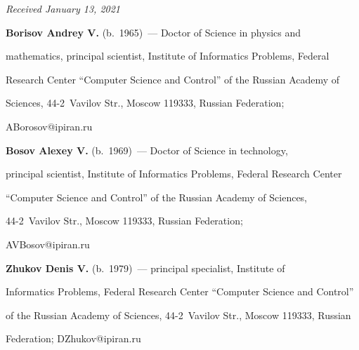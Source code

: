 \hfill{\small\textit{Received January 13, 2021}} 







 


 \Contr


 


 \noindent


 \textbf{Borisov Andrey V.} (b.\ 1965)~--- Doctor of Science in physics and 


mathematics, principal scientist, Institute of Informatics Problems, Federal 


Research Center ``Computer Science and Control'' of the Russian Academy of 


Sciences, 44-2~Vavilov Str., Moscow 119333, Russian Federation; 


\mbox{ABorosov@ipiran.ru}


 


 \vspace*{3pt}


 


 \noindent


 \textbf{Bosov Alexey V.} (b.\ 1969)~--- Doctor of Science in technology, 


principal scientist, Institute of Informatics Problems, Federal Research Center 


``Computer Science and Control'' of the Russian Academy of Sciences,


44-2~Vavilov Str., Moscow 119333, Russian Federation; 


\mbox{AVBosov@ipiran.ru}


 


 \vspace*{3pt}


 


 \noindent


 \textbf{Zhukov Denis V.} (b.\ 1979)~--- principal specialist, Institute of 


Informatics Problems, Federal Research Center ``Computer Science and Control'' 


of the Russian Academy of Sciences, 44-2~Vavilov Str., Moscow 119333, Russian 


Federation; \mbox{DZhukov@ipiran.ru}





\label{end\stat}





\renewcommand{\bibname}{\protect\rm Литература} 


